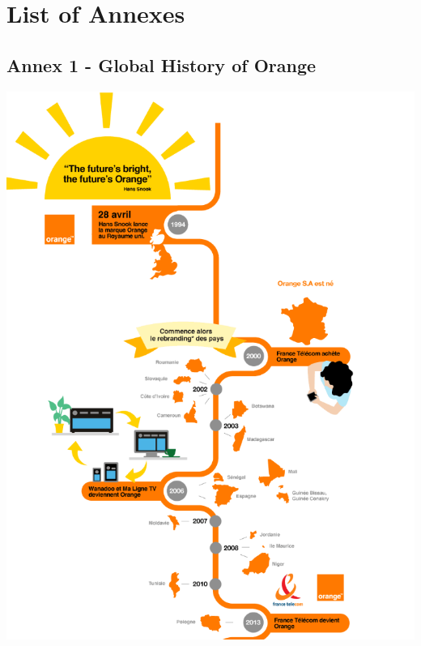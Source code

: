\section*{\Huge{List of Annexes}}

\subsection*{Annex 1 - Global History of Orange}
\begin{center}
\includegraphics[scale=1.37]{annexs/Orange Histoire .PNG}
\end{center}

